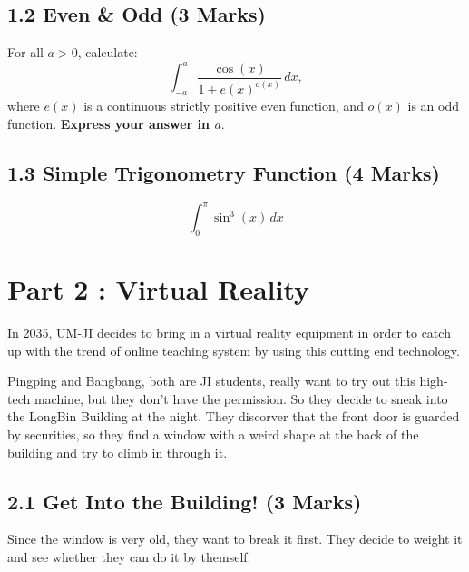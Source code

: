 \documentclass[12pt]{article}
\begin{document}
\subsection*{1.2 Even \& Odd (3 Marks)}
\par For all $a>0$, calculate:
\begin{equation*}
    \int^a_{-a} \frac{\cos(x)}{1 + e(x)^{o(x)}}\,dx, 
\end{equation*}
where $e(x)$ is a continuous strictly positive even function, and $o(x)$ is an odd function. \textbf{Express your answer in $a$}. 

\subsection*{1.3 Simple Trigonometry Function (4 Marks)}
\begin{equation*}
    \int^\pi_0 \sin^3(x)\,dx
\end{equation*}

\newpage
\section*{Part 2 : Virtual Reality}
\par In 2035, UM-JI decides to bring in a virtual reality equipment in order to catch up with the trend of online 
teaching system by using this cutting end technology.

\par Pingping and Bangbang, both are JI students, really want to try out this high-tech machine, but they don't have the
permission. So they decide to sneak into the LongBin Building at the night. They discorver that the front door is 
guarded by securities, so they find a window with a weird shape at the back of the building and try to
climb in through it. 

\subsection*{2.1 Get Into the Building! (3 Marks)}
\par Since the window is very old, they want to break it first. They decide to weight it and see whether 
they can do it by themself. 
\end{document}
